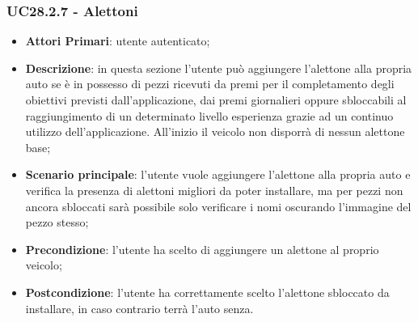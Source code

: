 \subsubsection{UC28.2.7 - Alettoni}
\begin{itemize}
	\item \textbf{Attori Primari}: utente autenticato;
	\item \textbf{Descrizione}: in questa sezione l'utente può aggiungere l'alettone alla propria auto se è in possesso di pezzi ricevuti da premi per il completamento degli obiettivi previsti dall'applicazione, dai premi giornalieri oppure sbloccabili al raggiungimento di un determinato livello esperienza grazie ad un continuo utilizzo dell'applicazione.
	All'inizio il veicolo non disporrà di nessun alettone base;
	\item \textbf{Scenario principale}: l'utente vuole aggiungere l'alettone alla propria auto e verifica la presenza di alettoni migliori da poter installare, ma per pezzi non ancora sbloccati sarà possibile solo verificare i nomi oscurando l'immagine del pezzo stesso;
	\item \textbf{Precondizione}: l'utente ha scelto di aggiungere un alettone al proprio veicolo; 
	\item \textbf{Postcondizione}: l'utente ha correttamente scelto l'alettone sbloccato da installare, in caso contrario terrà l'auto senza.
\end{itemize} 
